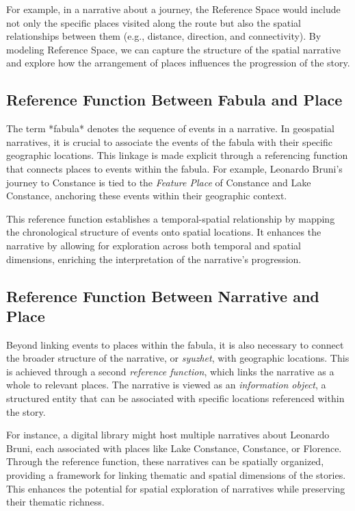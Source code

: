 For example, in a narrative about a journey, the Reference Space would include not only the specific places visited along the route but also the spatial relationships between them (e.g., distance, direction, and connectivity). By modeling Reference Space, we can capture the structure of the spatial narrative and explore how the arrangement of places influences the progression of the story.

\subsection{Reference Function Between Fabula and Place}\label{V-subsec:referenceFunctionFabulaPlace}

The term *fabula* denotes the sequence of events in a narrative. In geospatial narratives, it is crucial to associate the events of the fabula with their specific geographic locations. This linkage is made explicit through a referencing function that connects places to events within the fabula. For example, Leonardo Bruni’s journey to Constance is tied to the \textit{Feature Place} of Constance and Lake Constance, anchoring these events within their geographic context.

This reference function establishes a temporal-spatial relationship by mapping the chronological structure of events onto spatial locations. It enhances the narrative by allowing for exploration across both temporal and spatial dimensions, enriching the interpretation of the narrative’s progression.

\subsection{Reference Function Between Narrative and Place}\label{V-subsec:referenceFunctionNarrativePlace}

Beyond linking events to places within the fabula, it is also necessary to connect the broader structure of the narrative, or \textit{syuzhet}, with geographic locations. This is achieved through a second \textit{reference function}, which links the narrative as a whole to relevant places. The narrative is viewed as an \textit{information object}, a structured entity that can be associated with specific locations referenced within the story.

For instance, a digital library might host multiple narratives about Leonardo Bruni, each associated with places like Lake Constance, Constance, or Florence. Through the reference function, these narratives can be spatially organized, providing a framework for linking thematic and spatial dimensions of the stories. This enhances the potential for spatial exploration of narratives while preserving their thematic richness.

